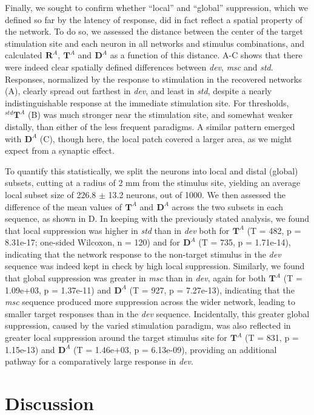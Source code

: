 \documentclass[9pt,lineno,onehalfspacing]{elife}
\newcommand{\dev}{\textit{dev}}
\newcommand{\msc}{\textit{msc}}
\newcommand{\std}{\textit{std}}
\newcommand{\R}[3][]{{}^{#1}_{}\boldsymbol R^{#2}_{#3}}
\newcommand{\T}[3][]{{}^{#1}_{}\boldsymbol T^{#2}_{#3}}
\newcommand{\D}[3][]{{}^{#1}_{}\boldsymbol D^{#2}_{#3}}
\begin{document}
Finally, we sought to confirm whether ``local'' and ``global'' suppression, which we defined so far by the latency of response, did in fact reflect a spatial property of the network. To do so, we assessed the distance between the center of the target stimulation site and each neuron in all networks and stimulus combinations, and calculated $\R{A}{}$, $\T{A}{}$ and $\D{A}{}$ as a function of this distance. A-C shows that there were indeed clear spatially defined differences between \dev{}, \msc{} and \std{}. Responses, normalized by the response to stimulation in the recovered networks (A), clearly spread out farthest in \dev{}, and least in \std{}, despite a nearly indistinguishable response at the immediate stimulation site. For thresholds, $\T[std]{A}{}$ (B) was much stronger near the stimulation site, and somewhat weaker distally, than either of the less frequent paradigms. A similar pattern emerged with $\D{A}{}$ (C), though here, the local patch covered a larger area, as we might expect from a synaptic effect.

To quantify this statistically, we split the neurons into local and distal (global) subsets, cutting at a radius of 2 mm from the stimulus site, yielding an average local subset size of 226.8 $\pm$ 13.2 neurons, out of 1000. We then assessed the difference of the mean values of $\T{A}{}$ and $\D{A}{}$ across the two subsets in each sequence, as shown in D. In keeping with the previously stated analysis, we found that local suppression was higher in \std{} than in \dev{} both for $\T{A}{}$ (T = 482, p = 8.31e-17; one-sided Wilcoxon, n = 120) and for $\D{A}{}$ (T = 735, p = 1.71e-14), indicating that the network response to the non-target stimulus in the \dev{} sequence was indeed kept in check by high local suppression. Similarly, we found that global suppression was greater in \msc{} than in \dev{}, again for both $\T{A}{}$ (T = 1.09e+03, p = 1.37e-11) and $\D{A}{}$ (T = 927, p = 7.27e-13), indicating that the \msc{} sequence produced more suppression across the wider network, leading to smaller target responses than in the \dev{} sequence. Incidentally, this greater global suppression, caused by the varied stimulation paradigm, was also reflected in greater local suppression around the target stimulus site for $\T{A}{}$ (T = 831, p = 1.15e-13) and $\D{A}{}$ (T = 1.46e+03, p = 6.13e-09), providing an additional pathway for a comparatively large response in \dev{}.

\section{Discussion}\label{sec:discussion}
\end{document}
